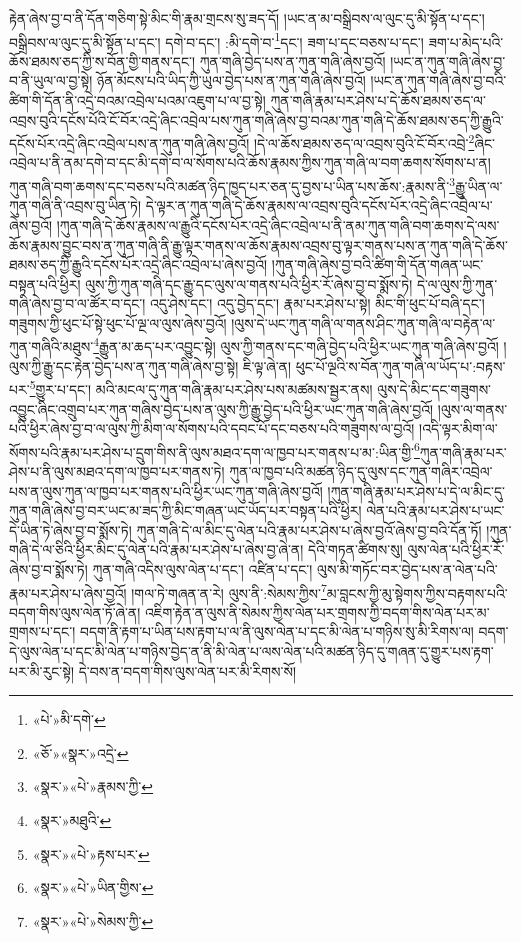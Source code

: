རྟེན་ཞེས་བྱ་བ་ནི་དོན་གཅིག་སྟེ་མིང་གི་རྣམ་གྲངས་སུ་ཟད་དོ། །ཡང་ན་མ་བསྒྲིབས་ལ་ལུང་དུ་མི་སྟོན་པ་དང་། བསྒྲིབས་ལ་ལུང་དུ་མི་སྟོན་པ་དང་། དགེ་བ་དང་། :མི་དགེ་བ་\footnote{«པེ་»མི་དགེ་}དང་། ཟག་པ་དང་བཅས་པ་དང་། ཟག་པ་མེད་པའི་ཆོས་ཐམས་ཅད་ཀྱི་ས་བོན་གྱི་གནས་དང་། ཀུན་གཞི་བྱེད་པས་ན་ཀུན་གཞི་ཞེས་བྱའོ། །ཡང་ན་ཀུན་གཞི་ཞེས་བྱ་བ་ནི་ཡུལ་ལ་བྱ་སྟེ། ཉོན་མོངས་པའི་ཡིད་ཀྱི་ཡུལ་བྱེད་པས་ན་ཀུན་གཞི་ཞེས་བྱའོ། །ཡང་ན་ཀུན་གཞི་ཞེས་བྱ་བའི་ཚིག་གི་དོན་ནི་འདྲེ་བའམ་འབྲེལ་པའམ་འཇུག་པ་ལ་བྱ་སྟེ། ཀུན་གཞི་རྣམ་པར་ཤེས་པ་དེ་ཆོས་ཐམས་ཅད་ལ་འབྲས་བུའི་དངོས་པོའི་ངོ་བོར་འདྲེ་ཞིང་འབྲེལ་པས་ཀུན་གཞི་ཞེས་བྱ་བའམ་ཀུན་གཞི་དེ་ཆོས་ཐམས་ཅད་ཀྱི་རྒྱུའི་དངོས་པོར་འདྲེ་ཞིང་འབྲེལ་པས་ན་ཀུན་གཞི་ཞེས་བྱའོ། །དེ་ལ་ཆོས་ཐམས་ཅད་ལ་འབྲས་བུའི་ངོ་བོར་འབྲེ་\footnote{«ཅོ་»«སྣར་»འདྲེ་}ཞིང་འབྲེལ་པ་ནི་ནམ་དགེ་བ་དང་མི་དགེ་བ་ལ་སོགས་པའི་ཆོས་རྣམས་ཀྱིས་ཀུན་གཞི་ལ་བག་ཆགས་སོགས་པ་ན། ཀུན་གཞི་བག་ཆགས་དང་བཅས་པའི་མཚན་ཉིད་ཁྱད་པར་ཅན་དུ་བྱས་པ་ཡིན་པས་ཆོས་:རྣམས་ནི་\footnote{«སྣར་»«པེ་»རྣམས་ཀྱི་}རྒྱུ་ཡིན་ལ་ཀུན་གཞི་ནི་འབྲས་བུ་ཡིན་ཏེ། དེ་ལྟར་ན་ཀུན་གཞི་དེ་ཆོས་རྣམས་ལ་འབྲས་བུའི་དངོས་པོར་འདྲེ་ཞིང་འབྲེལ་པ་ཞེས་བྱའོ། །ཀུན་གཞི་དེ་ཆོས་རྣམས་ལ་རྒྱུའི་དངོས་པོར་འདྲེ་ཞིང་འབྲེལ་པ་ནི་ནམ་ཀུན་གཞི་བག་ཆགས་དེ་ལས་ཆོས་རྣམས་བྱུང་བས་ན་ཀུན་གཞི་ནི་རྒྱུ་ལྟར་གནས་ལ་ཆོས་རྣམས་འབྲས་བུ་ལྟར་གནས་པས་ན་ཀུན་གཞི་དེ་ཆོས་ཐམས་ཅད་ཀྱི་རྒྱུའི་དངོས་པོར་འདྲེ་ཞིང་འབྲེལ་པ་ཞེས་བྱའོ། །ཀུན་གཞི་ཞེས་བྱ་བའི་ཚིག་གི་དོན་གཞན་ཡང་བསྟན་པའི་ཕྱིར། ལུས་ཀྱི་ཀུན་གཞི་དང་རྒྱུ་དང་ལུས་ལ་གནས་པའི་ཕྱིར་རོ་ཞེས་བྱ་བ་སྨོས་ཏེ། དེ་ལ་ལུས་ཀྱི་ཀུན་གཞི་ཞེས་བྱ་བ་ལ་ཚོར་བ་དང་། འདུ་ཤེས་དང་། འདུ་བྱེད་དང་། རྣམ་པར་ཤེས་པ་སྟེ། མིང་གི་ཕུང་པོ་བཞི་དང་། གཟུགས་ཀྱི་ཕུང་པོ་སྟེ་ཕུང་པོ་ལྔ་ལ་ལུས་ཞེས་བྱའོ། །ལུས་དེ་ཡང་ཀུན་གཞི་ལ་གནས་ཤིང་ཀུན་གཞི་ལ་བརྟེན་ལ་ཀུན་གཞིའི་མཐུས་\footnote{«སྣར་»མཐུའི་}རྒྱུན་མ་ཆད་པར་འབྱུང་སྟེ། ལུས་ཀྱི་གནས་དང་གཞི་བྱེད་པའི་ཕྱིར་ཡང་ཀུན་གཞི་ཞེས་བྱའོ། །ལུས་ཀྱི་རྒྱུ་དང་རྟེན་བྱེད་པས་ན་ཀུན་གཞི་ཞེས་བྱ་སྟེ། ཇི་ལྟ་ཞེ་ན། ཕུང་པོ་ལྔའི་ས་བོན་ཀུན་གཞི་ལ་ཡོད་པ་:བརྟས་པར་\footnote{«སྣར་»«པེ་»རྟས་པར་}གྱུར་པ་དང་། མའི་མངལ་དུ་ཀུན་གཞི་རྣམ་པར་ཤེས་པས་མཚམས་སྦྱར་ནས། ལུས་དེ་མིང་དང་གཟུགས་འབྱུང་ཞིང་འགྲུབ་པར་ཀུན་གཞིས་བྱེད་པས་ན་ལུས་ཀྱི་རྒྱུ་བྱེད་པའི་ཕྱིར་ཡང་ཀུན་གཞི་ཞེས་བྱའོ། །ལུས་ལ་གནས་པའི་ཕྱིར་ཞེས་བྱ་བ་ལ་ལུས་ཀྱི་མིག་ལ་སོགས་པའི་དབང་པོ་དང་བཅས་པའི་གཟུགས་ལ་བྱའོ། །འདི་ལྟར་མིག་ལ་སོགས་པའི་རྣམ་པར་ཤེས་པ་དྲུག་གིས་ནི་ལུས་མཐའ་དག་ལ་ཁྱབ་པར་གནས་པ་མ་:ཡིན་གྱི་\footnote{«སྣར་»«པེ་»ཡིན་གྱིས་}ཀུན་གཞི་རྣམ་པར་ཤེས་པ་ནི་ལུས་མཐའ་དག་ལ་ཁྱབ་པར་གནས་ཏེ། ཀུན་ལ་ཁྱབ་པའི་མཚན་ཉིད་དུ་ལུས་དང་ཀུན་གཞིར་འབྲེལ་པས་ན་ལུས་ཀུན་ལ་ཁྱབ་པར་གནས་པའི་ཕྱིར་ཡང་ཀུན་གཞི་ཞེས་བྱའོ། །ཀུན་གཞི་རྣམ་པར་ཤེས་པ་དེ་ལ་མིང་དུ་ཀུན་གཞི་ཞེས་བྱ་བར་ཡང་མ་ཟད་ཀྱི་མིང་གཞན་ཡང་ཡོད་པར་བསྟན་པའི་ཕྱིར། ལེན་པའི་རྣམ་པར་ཤེས་པ་ཡང་དེ་ཡིན་ཏེ་ཞེས་བྱ་བ་སྨོས་ཏེ། ཀུན་གཞི་དེ་ལ་མིང་དུ་ལེན་པའི་རྣམ་པར་ཤེས་པ་ཞེས་བྱའོ་ཞེས་བྱ་བའི་དོན་ཏོ། །ཀུན་གཞི་དེ་ལ་ཅིའི་ཕྱིར་མིང་དུ་ལེན་པའི་རྣམ་པར་ཤེས་པ་ཞེས་བྱ་ཞེ་ན། དེའི་གཏན་ཚིགས་སུ། ལུས་ལེན་པའི་ཕྱིར་རོ་ཞེས་བྱ་བ་སྨོས་ཏེ། ཀུན་གཞི་འདིས་ལུས་ལེན་པ་དང་། འཛིན་པ་དང་། ལུས་མི་གཏོང་བར་བྱེད་པས་ན་ལེན་པའི་རྣམ་པར་ཤེས་པ་ཞེས་བྱའོ། །གལ་ཏེ་གཞན་ན་རེ། ལུས་ནི་:སེམས་ཀྱིས་\footnote{«སྣར་»«པེ་»སེམས་ཀྱི་}མ་བླངས་ཀྱི་མུ་སྟེགས་ཀྱིས་བརྟགས་པའི་བདག་གིས་ལུས་ལེན་ཏོ་ཞེ་ན། འཇིག་རྟེན་ན་ལུས་ནི་སེམས་ཀྱིས་ལེན་པར་གྲགས་ཀྱི་བདག་གིས་ལེན་པར་མ་གྲགས་པ་དང་། བདག་ནི་རྟག་པ་ཡིན་པས་རྟག་པ་ལ་ནི་ལུས་ལེན་པ་དང་མི་ལེན་པ་གཉིས་སུ་མི་རིགས་ལ། བདག་དེ་ལུས་ལེན་པ་དང་མི་ལེན་པ་གཉིས་བྱེད་ན་ནི་མི་ལེན་པ་ལས་ལེན་པའི་མཚན་ཉིད་དུ་གཞན་དུ་གྱུར་པས་རྟག་པར་མི་རུང་སྟེ། དེ་བས་ན་བདག་གིས་ལུས་ལེན་པར་མི་རིགས་སོ། 